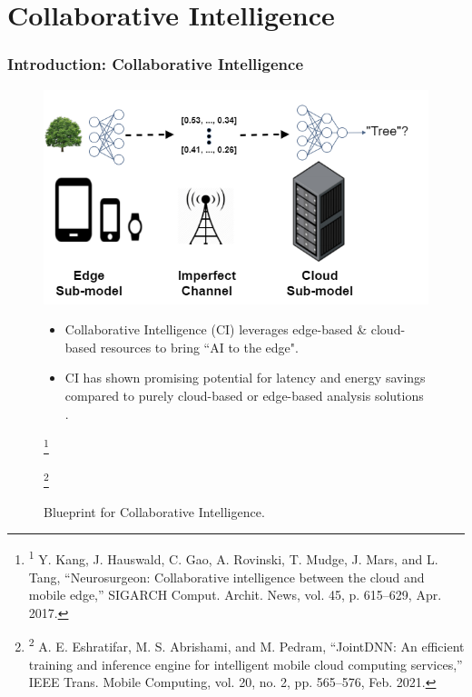 \documentclass[aspectratio=169]{beamer}
\newcommand\blfootnote[1]{%
	\begingroup
	\renewcommand\thefootnote{}\footnote{#1}%
	\addtocounter{footnote}{-1}%
	\endgroup
}
\begin{document}
\section{Collaborative Intelligence}
\begin{frame}
	\frametitle{Introduction: Collaborative Intelligence}
		\begin{figure}
		\begin{minipage}{.48\textwidth}
			\includegraphics[width=\linewidth]{image--000.png}
			\caption{Blueprint for Collaborative Intelligence. \cite{neurosurgeon}}
		\end{minipage}\hfill
		\begin{minipage}{.48\textwidth}
		\begin{itemize}
		    \item Collaborative Intelligence (CI) leverages edge-based \& cloud-based resources to bring ``AI to the edge". 
		    \item CI has shown promising potential for latency and energy savings compared to purely cloud-based or edge-based analysis solutions \cite{neurosurgeon,jointdnn}.
		\end{itemize}
		\end{minipage}
		\blfootnote{\tiny \textsuperscript{1} Y. Kang, J. Hauswald, C. Gao, A. Rovinski, T. Mudge, J. Mars, and L. Tang, “Neurosurgeon: Collaborative intelligence between the cloud and mobile edge,” SIGARCH Comput. Archit. News, vol. 45, p. 615–629, Apr. 2017.}
		\blfootnote{\tiny \textsuperscript{2} A. E. Eshratifar, M. S. Abrishami, and M. Pedram, “JointDNN: An efficient training and inference engine for intelligent mobile cloud computing services,” IEEE Trans. Mobile Computing, vol. 20, no. 2, pp. 565–576, Feb. 2021.}
	\end{figure}
\end{frame}
\end{document}
